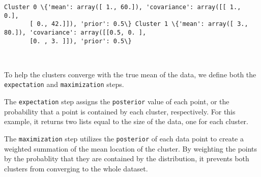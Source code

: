 \documentclass[11pt]{article}
\begin{document}
    \begin{Verbatim}[commandchars=\\\{\}]
Cluster 0 \{'mean': array([ 1., 60.]), 'covariance': array([[ 1.,  0.],
       [ 0., 42.]]), 'prior': 0.5\} Cluster 1 \{'mean': array([ 3., 80.]), 'covariance': array([[0.5, 0. ],
       [0. , 3. ]]), 'prior': 0.5\}

    \end{Verbatim}

    \begin{center}
    \end{center}
    { \hspace*{\fill} \\}
    
    To help the clusters converge with the true mean of the data, we define
both the \texttt{expectation} and \texttt{maximization} steps.

The \texttt{expectation} step assigns the \texttt{posterior} value of
each point, or the probability that a point is contained by each
cluster, respectively. For this example, it returns two lists equal to
the size of the data, one for each cluster.

The \texttt{maximization} step utilizes the \texttt{posterior} of each
data point to create a weighted summation of the mean location of the
cluster. By weighting the points by the probablity that they are
contained by the distribution, it prevents both clusters from converging
to the whole dataset.
\end{document}
